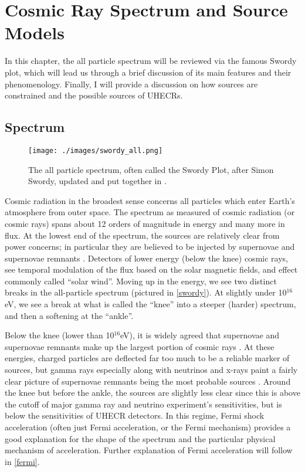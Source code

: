 
\chapter{Cosmic Ray Spectrum and Source Models}
In this chapter, the all particle spectrum will be reviewed via the famous Swordy plot, which will lead us through a brief discussion of its main features and their phenomenology. Finally, I will provide a discussion on how sources are constrained and the possible sources of UHECRs.
\section{Spectrum}

\begin{figure}
\begin{center}
\texttt{[image: ./images/swordy\_all.png]}
\begin{singlespace}
\caption[All Particle Spectrum (Swordy Plot)]{The all particle spectrum, often called the Swordy Plot, after Simon Swordy, updated and put together in \cite{swordyplot}.}
\end{singlespace}
\label{swordy}
\end{center}
\end{figure}


Cosmic radiation in the broadest sense concerns all particles which enter Earth's atmosphere from outer space. The spectrum as measured of cosmic radiation (or cosmic rays) spans about 12 orders of magnitude in energy and many more in flux. At the lowest end of the spectrum, the sources are relatively clear from power concerns; in particular they are believed to be injected by supernovae and supernovae remnants \cite{stanev}. Detectors of lower energy (below the knee) cosmic rays, see temporal modulation of the flux based on the solar magnetic fields, and effect commonly called ``solar wind''. Moving up in the energy, we see two distinct breaks in the all-particle spectrum (pictured in \autoref{swordy}). At slightly under 10$^{16}$eV, we see a break at what is called the ``knee'' into a steeper (harder) spectrum, and then a softening at the ``ankle''. 

Below the knee (lower than 10$^{16}$eV), it is widely agreed that supernovae and supernovae remnants make up the largest portion of cosmic rays \cite{stanev, crapp}. At these energies, charged particles are deflected far too much to be a reliable marker of sources, but gamma rays especially along with neutrinos and x-rays paint a fairly clear picture of supernovae remnants being the most probable sources \cite{stanev, sean, foteini}. Around the knee but before the ankle, the sources are slightly less clear since this is above the cutoff of major gamma ray and neutrino experiment's sensitivities, but is below the sensitivities of UHECR detectors. In this regime, Fermi shock acceleration (often just Fermi acceleration, or the Fermi mechanism) provides a good explanation for the shape of the spectrum and the particular physical mechanism of acceleration. Further explanation of Fermi acceleration will follow in \autoref{fermi}.

